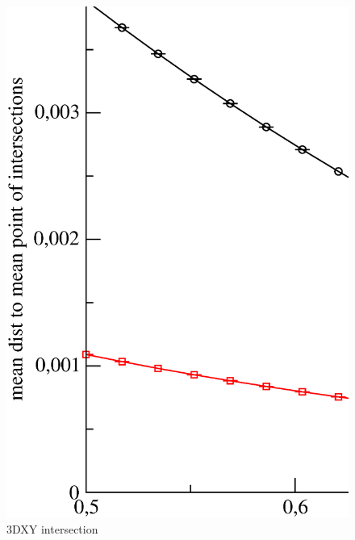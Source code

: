 \begin{figure}[!htpb]
  \centering
  \includegraphics[width=\textwidth]{./plots/3DXY/vsO/intersection.eps}
  \caption{3DXY intersection}
\end{figure}

